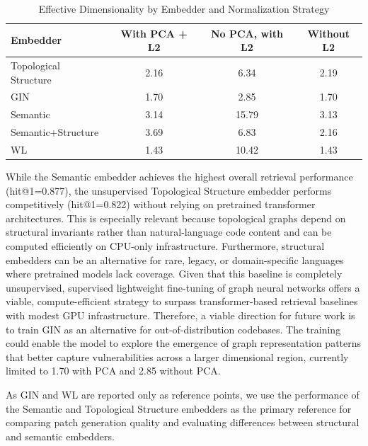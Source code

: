\begin{table}[H]
\centering
  \caption{Effective Dimensionality by Embedder and Normalization Strategy}
  \label{tab:dimensionality}
  \small
  \begin{tabular}{l c c c}
    \toprule
    \textbf{Embedder} & \textbf{With PCA + L2} & \textbf{No PCA, with L2} & \textbf{Without L2} \\
    \midrule
    Topological Structure & 2.16 & 6.34 & 2.19 \\
    GIN & 1.70 & 2.85 & 1.70 \\
    Semantic & 3.14 & 15.79 & 3.13 \\
    Semantic+Structure & 3.69 & 6.83 & 2.16 \\
    WL & 1.43 & 10.42 & 1.43 \\
    \bottomrule
  \end{tabular}
\end{table}

While the Semantic embedder achieves the highest overall retrieval performance (hit@1=0.877), the unsupervised Topological Structure embedder performs competitively (hit@1=0.822) without relying on pretrained transformer architectures. 
This is especially relevant because topological graphs depend on structural invariants rather than natural-language code content and can be computed efficiently on CPU-only infrastructure.
Furthermore, structural embedders can be an alternative for rare, legacy, or domain-specific languages where pretrained models lack coverage.
Given that this baseline is completely unsupervised, supervised lightweight fine-tuning of graph neural networks offers a viable, compute-efficient strategy to surpass transformer-based retrieval baselines with modest GPU infrastructure.
Therefore, a viable direction for future work is to train GIN as an alternative for out-of-distribution codebases. The training could enable the model to explore the emergence of graph representation patterns that better capture vulnerabilities across a larger dimensional region, currently limited to 1.70 with PCA and 2.85 without PCA.

As GIN and WL are reported only as reference points, we use the performance of the Semantic and Topological Structure embedders as the primary reference for comparing patch generation quality and evaluating differences between structural and semantic embedders. 


